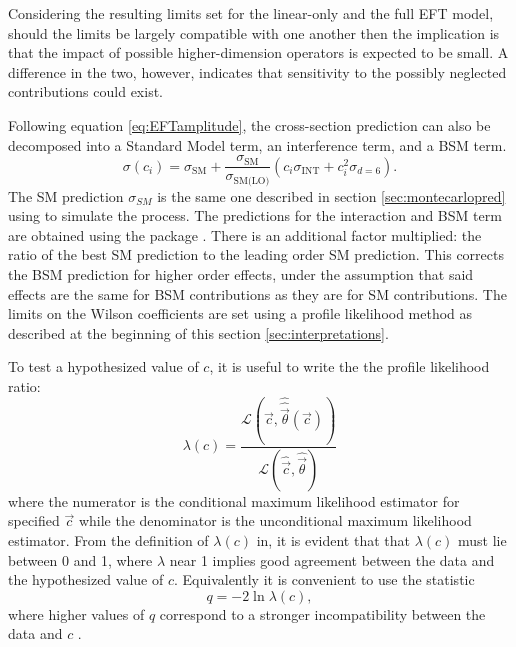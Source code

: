 Considering the resulting limits set for the linear-only and the full EFT model, should the limits be largely compatible with one another then the implication is that the impact of possible higher-dimension operators is expected to be small. A difference in the two, however, indicates that sensitivity to the possibly neglected contributions could exist.

Following equation \ref{eq:EFTamplitude}, the cross-section prediction can also be decomposed into a Standard Model term, an interference term, and a BSM term. 
\begin{equation} \label{eq:SMEFTXS}
 \sigma(c_i)= \sigma_{\text{SM}} + \frac{\sigma_{\text{SM}}}{\sigma_{\text{SM(LO)}}}(c_i \sigma_{\text{INT}} + c^2_i \sigma_{d=6}).
\end{equation}
The SM prediction $\sigma_{SM}$ is the same one described in section \ref{sec:montecarlopred} using \SHERPA to simulate the \qqFourL process. The predictions for the interaction and BSM term are obtained using the \SMEFTsim {} package \cite{SMEFTsim}. There is an additional factor multiplied: the ratio of the best SM prediction to the leading order SM prediction. This corrects the BSM prediction for higher order effects, under the assumption that said effects are the same for BSM contributions as they are for SM contributions. 
The limits on the Wilson coefficients are set using a profile likelihood method as described at the beginning of this section \ref{sec:interpretations}. 

To test a hypothesized value of $c$, it is useful to write the the profile likelihood ratio:
\begin{equation}
    \lambda(c) = \frac{\mathcal{L}( \vec{c}, \hat{\hat{\vec{\theta}}}(\vec{c})) } {\mathcal{L}(\hat{{\vec{c}}}, \hat{{\vec{\theta}}} )}
\end{equation}
where the numerator is the conditional maximum likelihood estimator for specified $\vec{c}$ while the denominator is the unconditional maximum likelihood estimator. 
From the definition of $\lambda(c)$ in, it is evident that that $\lambda(c)$ must lie between 0 and 1, where $\lambda$ near 1 implies good agreement between the data and the hypothesized value of $c$. Equivalently it is convenient to use the statistic
\begin{equation}\label{eq:lambda_simplified}
    q = - 2 \ln \lambda(c),
\end{equation}
where higher values of $q$ correspond to a stronger incompatibility between the data and $c$ \cite{gcowan}.

